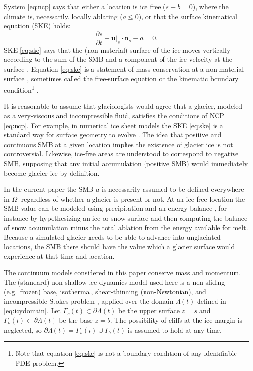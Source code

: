 \documentclass[hidelinks,onefignum,onetabnum,final]{siamart220329}  %
\newcommand{\bn}{\mathbf{n}}
\newcommand{\bu}{\mathbf{u}}
\begin{document}
System \eqref{eq:ncp} says that either a location is ice free ($s-b=0$), where the climate is, necessarily, locally ablating ($a\le 0$), or that the surface kinematical equation (SKE) holds:
\begin{equation}
\frac{\partial s}{\partial t} - \bu|_s \cdot \bn_s - a = 0.  \label{eq:ske}
\end{equation}
SKE \eqref{eq:ske} says that the (non-material) surface of the ice moves vertically according to the sum of the SMB and a component of the ice velocity at the surface \cite{SchoofHewitt2013}.  Equation \eqref{eq:ske} is a statement of mass conservation at a non-material surface \cite{Aschwandenetal2012}, sometimes called the free-surface equation \cite{LofgrenAhlkronaHelanow2022} or the kinematic boundary condition\footnote{Note that equation \eqref{eq:ske} is not a boundary condition of any identifiable PDE problem.} \cite{GreveBlatter2009}.

It is reasonable to assume that glaciologists would agree that a glacier, modeled as a very-viscous and incompressible fluid, satisfies the conditions of NCP \eqref{eq:ncp}.  For example, in numerical ice sheet models the SKE \eqref{eq:ske} is a standard way for surface geometry to evolve \cite{GreveBlatter2009,SchoofHewitt2013}.  The idea that positive and continuous SMB at a given location implies the existence of glacier ice is not controversial.  Likewise, ice-free areas are understood to correspond to negative SMB, supposing that any initial accumulation (positive SMB) would immediately become glacier ice by definition.

In the current paper the SMB $a$ is necessarily assumed to be defined everywhere in $\Omega$, regardless of whether a glacier is present or not.  At an ice-free location the SMB value can be modeled using precipitation and an energy balance \cite{GreveBlatter2009}, for instance by hypothesizing an ice or snow surface and then computing the balance of snow accumulation minus the total ablation from the energy available for melt.  Because a simulated glacier needs to be able to advance into unglaciated locations, the SMB there should have the value which a glacier surface would experience at that time and location.

The continuum models considered in this paper conserve mass and momentum.   The (standard) non-shallow ice dynamics model used here is a non-sliding (e.g.~frozen) base, isothermal, shear-thinning (non-Newtonian), and incompressible Stokes problem \cite{GreveBlatter2009,JouvetRappaz2011,SchoofHewitt2013}, applied over the domain $\Lambda(t)$ defined in \eqref{eq:icydomain}.  Let $\Gamma_s(t) \subset \partial \Lambda(t)$ be the upper surface $z=s$ and $\Gamma_b(t) \subset \partial \Lambda(t)$ be the base $z=b$.  The possibility of cliffs at the ice margin is neglected, so $\partial \Lambda(t) = \overline{\Gamma_s(t)} \cup \overline{\Gamma_b(t)}$ is assumed to hold at any time.
\end{document}
